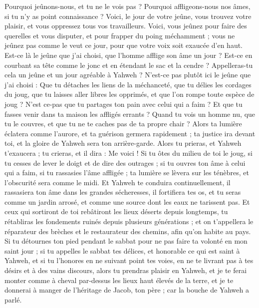 \begin{multicols}{2}
Pourquoi jeûnons-nous, et tu ne le vois pas ? Pourquoi affligeons-nous nos âmes, si tu n'y as point connaissance ? Voici, le jour de votre jeûne, vous trouvez votre plaisir, et vous oppressez tous vos travailleurs.
Voici, vous jeûnez pour faire des querelles et vous disputer, et pour frapper du poing méchamment ; vous ne jeûnez pas comme le veut ce jour, pour que votre voix soit exaucée d'en haut.
Est-ce là le jeûne que j'ai choisi, que l'homme afflige son âme un jour ? Est-ce en courbant sa tête comme le jonc et en étendant le sac et la cendre ? Appelleras-tu cela un jeûne et un jour agréable à Yahweh ?
N'est-ce pas plutôt ici le jeûne que j'ai choisi : Que tu détaches les liens de la méchanceté, que tu délies les cordages du joug, que tu laisses aller libres les opprimés, et que l'on rompe toute espèce de joug ?
N'est ce-pas que tu partages ton pain avec celui qui a faim ? Et que tu fasses venir dans ta maison les affligés errants ? Quand tu vois un homme nu, que tu le couvres, et que tu ne te caches pas de ta propre chair ?
Alors ta lumière éclatera comme l'aurore, et ta guérison germera rapidement ; ta justice ira devant toi, et la gloire de Yahweh sera ton arrière-garde.
Alors tu prieras, et Yahweh t'exaucera ; tu crieras, et il dira : Me voici ! Si tu ôtes du milieu de toi le joug, si tu cesses de lever le doigt et de dire des outrages ;
si tu ouvres ton âme à celui qui a faim, si tu rassasies l'âme affligée ; ta lumière se lèvera sur les ténèbres, et l'obscurité sera comme le midi.
Et Yahweh te conduira continuellement, il rassasiera ton âme dans les grandes sécheresses, il fortifiera tes os, et tu seras comme un jardin arrosé, et comme une source dont les eaux ne tarissent pas.
Et ceux qui sortiront de toi rebâtiront les lieux déserts depuis longtemps, tu rétabliras les fondements ruinés depuis plusieurs générations ; et on t'appellera le réparateur des brèches et le restaurateur des chemins, afin qu'on habite au pays.
Si tu détournes ton pied pendant le sabbat pour ne pas faire ta volonté en mon saint jour ; si tu appelles le sabbat tes délices, et honorable ce qui est saint à Yahweh, et si tu l'honores en ne suivant point tes voies, en ne te livrant pas à tes désirs et à des vains discours,
alors tu prendras plaisir en Yahweh, et je te ferai monter comme à cheval par-dessus les lieux haut élevés de la terre, et je te donnerai à manger de l'héritage de Jacob, ton père ; car la bouche de Yahweh a parlé.

\end{multicols}
